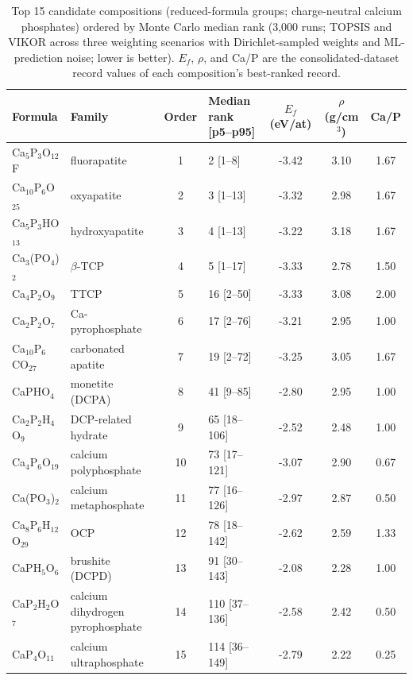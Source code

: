 \documentclass[11pt,a4paper]{article}
\begin{document}
\begin{table}[ht]
\centering\small
\caption{Top 15 candidate compositions (reduced-formula groups; charge-neutral calcium phosphates) ordered by Monte Carlo median rank (3{,}000 runs; TOPSIS and VIKOR across three weighting scenarios with Dirichlet-sampled weights and ML-prediction noise; lower is better). $E_f$, $\rho$, and Ca/P are the consolidated-dataset record values of each composition's best-ranked record.}
\label{tab:top}
\begin{tabular}{llclccc}
\toprule
Formula & Family & Order & Median rank [p5--p95] & $E_f$ (eV/at) & $\rho$ (g/cm$^3$) & Ca/P \\
\midrule
Ca$_5$P$_3$O$_{12}$F & fluorapatite & 1 & 2 [1--8] & -3.42 & 3.10 & 1.67 \\
Ca$_{10}$P$_6$O$_{25}$ & oxyapatite & 2 & 3 [1--13] & -3.32 & 2.98 & 1.67 \\
Ca$_5$P$_3$HO$_{13}$ & hydroxyapatite & 3 & 4 [1--13] & -3.22 & 3.18 & 1.67 \\
Ca$_3$(PO$_4$)$_2$ & $\beta$-TCP & 4 & 5 [1--17] & -3.33 & 2.78 & 1.50 \\
Ca$_4$P$_2$O$_9$ & TTCP & 5 & 16 [2--50] & -3.33 & 3.08 & 2.00 \\
Ca$_2$P$_2$O$_7$ & Ca-pyrophosphate & 6 & 17 [2--76] & -3.21 & 2.95 & 1.00 \\
Ca$_{10}$P$_6$CO$_{27}$ & carbonated apatite & 7 & 19 [2--72] & -3.25 & 3.05 & 1.67 \\
CaPHO$_4$ & monetite (DCPA) & 8 & 41 [9--85] & -2.80 & 2.95 & 1.00 \\
Ca$_2$P$_2$H$_4$O$_9$ & DCP-related hydrate & 9 & 65 [18--106] & -2.52 & 2.48 & 1.00 \\
Ca$_4$P$_6$O$_{19}$ & calcium polyphosphate & 10 & 73 [17--121] & -3.07 & 2.90 & 0.67 \\
Ca(PO$_3$)$_2$ & calcium metaphosphate & 11 & 77 [16--126] & -2.97 & 2.87 & 0.50 \\
Ca$_8$P$_6$H$_{12}$O$_{29}$ & OCP & 12 & 78 [18--142] & -2.62 & 2.59 & 1.33 \\
CaPH$_5$O$_6$ & brushite (DCPD) & 13 & 91 [30--143] & -2.08 & 2.28 & 1.00 \\
CaP$_2$H$_2$O$_7$ & calcium dihydrogen pyrophosphate & 14 & 110 [37--136] & -2.58 & 2.42 & 0.50 \\
CaP$_4$O$_{11}$ & calcium ultraphosphate & 15 & 114 [36--149] & -2.79 & 2.22 & 0.25 \\
\bottomrule
\end{tabular}
\end{table}
\end{document}
